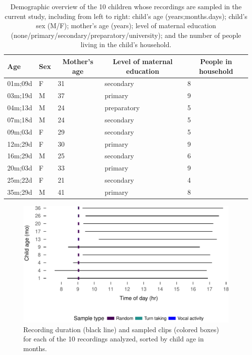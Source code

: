 \documentclass[floatsintext,man]{apa6}
\theoremstyle{definition}
\theoremstyle{definition}
\theoremstyle{definition}
\theoremstyle{remark}
\begin{document}
\begin{table}[tbp]
\begin{center}
\begin{threeparttable}
\caption{\label{tab:tab1}Demographic overview of the 10 children whose recordings are sampled in the current study, including from left to right: child's age (years;months.days); child's sex (M/F); mother's age (years); level of maternal education (none/primary/secondary/preparatory/university); and the number of people living in the child's household.}
\begin{tabular}{lllll}
\toprule
Age & \multicolumn{1}{c}{Sex} & \multicolumn{1}{c}{Mother's age} & \multicolumn{1}{c}{Level of maternal education} & \multicolumn{1}{c}{People in household}\\
\midrule
01m;09d & F & 31 & secondary & 8\\
03m;19d & M & 37 & primary & 9\\
04m;13d & M & 24 & preparatory & 5\\
07m;18d & M & 24 & secondary & 5\\
09m;03d & F & 29 & secondary & 5\\
12m;29d & F & 30 & primary & 9\\
16m;29d & M & 25 & secondary & 6\\
20m;03d & F & 33 & primary & 9\\
25m;22d & F & 21 & secondary & 4\\
35m;29d & M & 41 & primary & 8\\
\bottomrule
\end{tabular}
\end{threeparttable}
\end{center}
\end{table}

\begin{figure}
\centering
\includegraphics{Yeli-CLE_files/figure-latex/fig2-1.pdf}
\caption{\label{fig:fig2}Recording duration (black line) and sampled clips
(colored boxes) for each of the 10 recordings analyzed, sorted by child
age in months.}
\end{figure}
\end{document}
